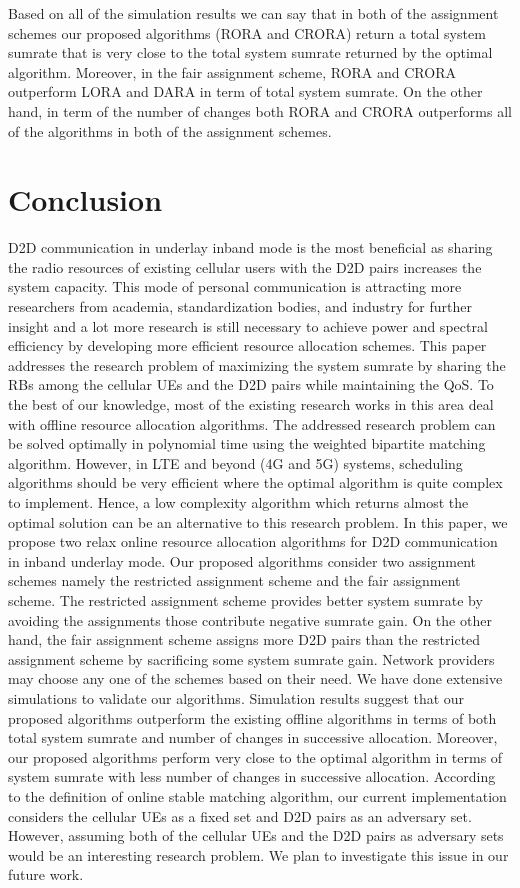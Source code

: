 \documentclass[times]{dacauth}
\begin{document}
\noindent
Based on all of the simulation results we can say that in both of the assignment schemes our proposed algorithms (RORA and CRORA) return a total system sumrate that is very close to the total system sumrate returned by the optimal algorithm. Moreover, in the fair assignment scheme, RORA and CRORA outperform LORA and DARA in term of total system sumrate. On the other hand, in term of the number of changes both RORA and CRORA outperforms all of the algorithms in both of the assignment schemes.
\section{Conclusion}\label{section:Conclusion}
\vspace {-0.3cm}
\smallskip
\noindent
D2D communication in underlay inband mode is the most beneficial as sharing the radio resources of existing cellular users with the D2D pairs increases the system capacity. This mode of personal communication is attracting more researchers from academia, standardization bodies, and industry for further insight and a lot more research is still necessary to achieve power and spectral efficiency by developing more efficient resource allocation schemes. This paper addresses the research problem of maximizing the system sumrate by sharing the RBs among the cellular UEs and the D2D pairs while maintaining the QoS. To the best of our knowledge, most of the existing research works in this area deal with offline resource allocation algorithms. The addressed research problem can be solved optimally in polynomial time using the weighted bipartite matching algorithm. However, in LTE and beyond (4G and 5G) systems, scheduling algorithms should be very efficient where the optimal algorithm is quite complex to implement. Hence, a low complexity algorithm which returns almost the optimal solution can be an alternative to this research problem. In this paper, we propose two relax online resource allocation algorithms for D2D communication in inband underlay mode. Our proposed algorithms consider two assignment schemes namely the restricted assignment scheme and the fair assignment scheme. The restricted assignment scheme provides better system sumrate by avoiding the assignments those contribute negative sumrate gain. On the other hand, the fair assignment scheme assigns more D2D pairs than the restricted assignment scheme by sacrificing some system sumrate gain. Network providers may choose any one of the schemes based on their need. We have done extensive simulations to validate our algorithms. Simulation results suggest that our proposed algorithms outperform the existing offline algorithms in terms of both total system sumrate and number of changes in successive allocation. Moreover, our proposed algorithms perform very close to the optimal algorithm in terms of system sumrate with less number of changes in successive allocation. According to the definition of online stable matching algorithm, our current implementation considers the cellular UEs as a fixed set and D2D pairs as an adversary set. However, assuming both of the cellular UEs and the D2D pairs as adversary sets would be an interesting research problem. We plan to investigate this issue in our future work.



\end{document}
